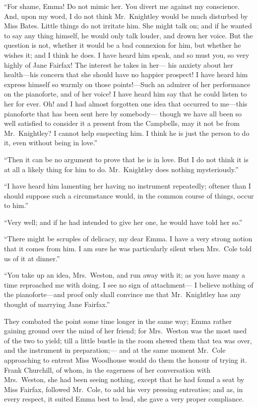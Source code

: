``For shame, Emma!  Do not mimic her.  You divert me against
my conscience.  And, upon my word, I do not think Mr.\ Knightley would
be much disturbed by Miss Bates.  Little things do not irritate him.
She might talk on; and if he wanted to say any thing himself, he would
only talk louder, and drown her voice.  But the question is not,
whether it would be a bad connexion for him, but whether he wishes it;
and I think he does.  I have heard him speak, and so must you,
so very highly of Jane Fairfax!  The interest he takes in her---%
his anxiety about her health---his concern that she should have no
happier prospect!  I have heard him express himself so warmly on
those points!---Such an admirer of her performance on the pianoforte,
and of her voice!  I have heard him say that he could listen to her
for ever.  Oh! and I had almost forgotten one idea that occurred
to me---this pianoforte that has been sent here by somebody---%
though we have all been so well satisfied to consider it a present
from the Campbells, may it not be from Mr.\ Knightley?  I cannot
help suspecting him.  I think he is just the person to do it,
even without being in love.''

``Then it can be no argument to prove that he is in love.
But I do not think it is at all a likely thing for him to do.
Mr.\ Knightley does nothing mysteriously.''

``I have heard him lamenting her having no instrument repeatedly;
oftener than I should suppose such a circumstance would, in the common
course of things, occur to him.''

``Very well; and if he had intended to give her one, he would have
told her so.''

``There might be scruples of delicacy, my dear Emma.  I have a very
strong notion that it comes from him.  I am sure he was particularly
silent when Mrs.\ Cole told us of it at dinner.''

``You take up an idea, Mrs.\ Weston, and run away with it; as you have
many a time reproached me with doing.  I see no sign of attachment---%
I believe nothing of the pianoforte---and proof only shall convince
me that Mr.\ Knightley has any thought of marrying Jane Fairfax.''

They combated the point some time longer in the same way; Emma rather
gaining ground over the mind of her friend; for Mrs.\ Weston was
the most used of the two to yield; till a little bustle in the room
shewed them that tea was over, and the instrument in preparation;---%
and at the same moment Mr.\ Cole approaching to entreat Miss Woodhouse
would do them the honour of trying it.  Frank Churchill, of whom,
in the eagerness of her conversation with Mrs.\ Weston, she had been
seeing nothing, except that he had found a seat by Miss Fairfax,
followed Mr.\ Cole, to add his very pressing entreaties; and as,
in every respect, it suited Emma best to lead, she gave a very
proper compliance.

